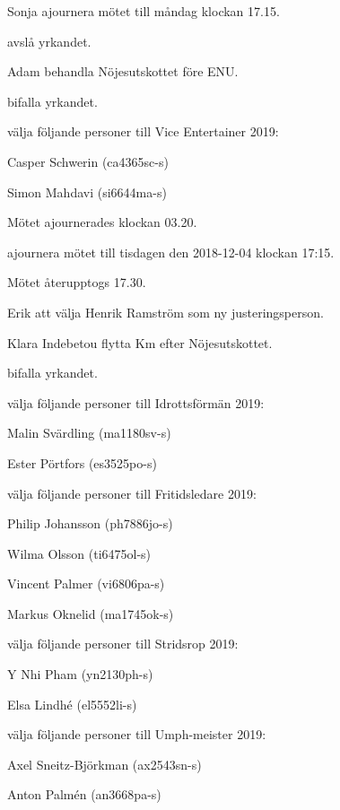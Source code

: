 \documentclass[10pt]{article}
\begin{document}
\begin{paragrafer}
\begin{paralist}
    Sonja \ypa ajournera mötet till måndag klockan 17.15.

    \Mba avslå yrkandet.

    Adam \ypa behandla Nöjesutskottet före ENU.

    \Mba bifalla yrkandet.

    \Mba välja följande personer till Vice Entertainer 2019:
    \begin{tightdashlist}
        \item Casper Schwerin (ca4365sc-s)
        \item Simon Mahdavi (si6644ma-s)
    \end{tightdashlist}

    Mötet ajournerades klockan 03.20.

    \Mba ajournera mötet till tisdagen den 2018-12-04 klockan 17:15.

    Mötet återupptogs 17.30.

    Erik \ypa att välja Henrik Ramström som ny justeringsperson.

    Klara Indebetou \ypa flytta Km efter Nöjesutskottet.

    \Mba bifalla yrkandet. 

    \Mba välja följande personer till Idrottsförmän 2019:
    \begin{tightdashlist}
        \item Malin Svärdling (ma1180sv-s)
        \item Ester Pörtfors (es3525po-s)
    \end{tightdashlist}

    \Mba välja följande personer till Fritidsledare 2019:
    \begin{tightdashlist}
        \item Philip Johansson (ph7886jo-s)
        \item Wilma Olsson (ti6475ol-s)
        \item Vincent Palmer (vi6806pa-s)
        \item Markus Oknelid (ma1745ok-s)
    \end{tightdashlist}

    \Mba välja följande personer till Stridsrop 2019:
    \begin{tightdashlist}
        \item Y Nhi Pham (yn2130ph-s) 
        \item Elsa Lindhé (el5552li-s)
    \end{tightdashlist}

    \Mba välja följande personer till Umph-meister 2019:
    \begin{tightdashlist}
        \item Axel Sneitz-Björkman (ax2543sn-s)
        \item Anton Palmén (an3668pa-s)
    \end{tightdashlist}


\end{paralist}
\end{paragrafer}
\end{document}
